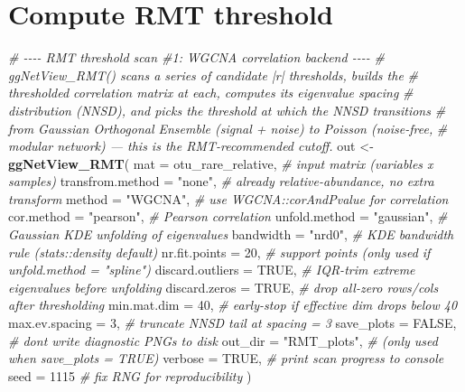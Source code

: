 \documentclass[
]{book}
\newenvironment{Shaded}{\begin{snugshade}}{\end{snugshade}}
\newcommand{\AttributeTok}[1]{\textcolor[rgb]{0.13,0.29,0.53}{#1}}
\newcommand{\CommentTok}[1]{\textcolor[rgb]{0.56,0.35,0.01}{\textit{#1}}}
\newcommand{\ConstantTok}[1]{\textcolor[rgb]{0.56,0.35,0.01}{#1}}
\newcommand{\DecValTok}[1]{\textcolor[rgb]{0.00,0.00,0.81}{#1}}
\newcommand{\FunctionTok}[1]{\textcolor[rgb]{0.13,0.29,0.53}{\textbf{#1}}}
\newcommand{\NormalTok}[1]{#1}
\newcommand{\OtherTok}[1]{\textcolor[rgb]{0.56,0.35,0.01}{#1}}
\newcommand{\StringTok}[1]{\textcolor[rgb]{0.31,0.60,0.02}{#1}}
\begin{document}
\section{Compute RMT threshold}\label{compute-rmt-threshold}

\begin{Shaded}
\begin{Highlighting}[]
\CommentTok{\# {-}{-}{-}{-} RMT threshold scan \#1: WGCNA correlation backend {-}{-}{-}{-}}
\CommentTok{\# \textasciigrave{}ggNetView\_RMT()\textasciigrave{} scans a series of candidate |r| thresholds, builds the}
\CommentTok{\# thresholded correlation matrix at each, computes its eigenvalue spacing}
\CommentTok{\# distribution (NNSD), and picks the threshold at which the NNSD transitions}
\CommentTok{\# from Gaussian Orthogonal Ensemble (signal + noise) to Poisson (noise{-}free,}
\CommentTok{\# modular network) — this is the RMT{-}recommended cutoff.}
\NormalTok{out }\OtherTok{\textless{}{-}} \FunctionTok{ggNetView\_RMT}\NormalTok{(}
  \AttributeTok{mat              =}\NormalTok{ otu\_rare\_relative, }\CommentTok{\# input matrix (variables x samples)}
  \AttributeTok{transfrom.method =} \StringTok{"none"}\NormalTok{,            }\CommentTok{\# already relative{-}abundance, no extra transform}
  \AttributeTok{method           =} \StringTok{"WGCNA"}\NormalTok{,           }\CommentTok{\# use WGCNA::corAndPvalue for correlation}
  \AttributeTok{cor.method       =} \StringTok{"pearson"}\NormalTok{,         }\CommentTok{\# Pearson correlation}
  \AttributeTok{unfold.method    =} \StringTok{"gaussian"}\NormalTok{,        }\CommentTok{\# Gaussian KDE unfolding of eigenvalues}
  \AttributeTok{bandwidth        =} \StringTok{"nrd0"}\NormalTok{,            }\CommentTok{\# KDE bandwidth rule (stats::density default)}
  \AttributeTok{nr.fit.points    =} \DecValTok{20}\NormalTok{,                }\CommentTok{\# support points (only used if unfold.method = "spline")}
  \AttributeTok{discard.outliers =} \ConstantTok{TRUE}\NormalTok{,              }\CommentTok{\# IQR{-}trim extreme eigenvalues before unfolding}
  \AttributeTok{discard.zeros    =} \ConstantTok{TRUE}\NormalTok{,              }\CommentTok{\# drop all{-}zero rows/cols after thresholding}
  \AttributeTok{min.mat.dim      =} \DecValTok{40}\NormalTok{,                }\CommentTok{\# early{-}stop if effective dim drops below 40}
  \AttributeTok{max.ev.spacing   =} \DecValTok{3}\NormalTok{,                 }\CommentTok{\# truncate NNSD tail at spacing = 3}
  \AttributeTok{save\_plots       =} \ConstantTok{FALSE}\NormalTok{,             }\CommentTok{\# don\textquotesingle{}t write diagnostic PNGs to disk}
  \AttributeTok{out\_dir          =} \StringTok{"RMT\_plots"}\NormalTok{,       }\CommentTok{\# (only used when save\_plots = TRUE)}
  \AttributeTok{verbose          =} \ConstantTok{TRUE}\NormalTok{,              }\CommentTok{\# print scan progress to console}
  \AttributeTok{seed             =} \DecValTok{1115}               \CommentTok{\# fix RNG for reproducibility}
\NormalTok{)}
\end{Highlighting}
\end{Shaded}
\end{document}
